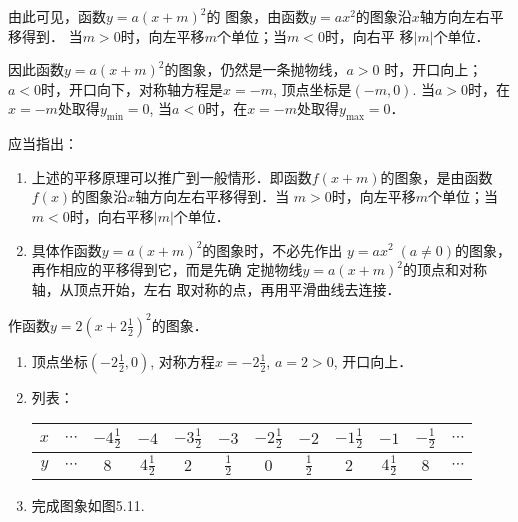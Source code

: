 由此可见，函数$y=a(x+m)^2$的
图象，由函数$y=ax^2$的图象沿$x$轴方向左右平移得到．
当$m>0$时，向左平移$m$个单位；当$m<0$时，向右平
移$|m|$个单位．

因此函数$y=a(x+m)^2$的图象，仍然是一条抛物线，$a>0$
时，开口向上；$a<0$时，开口向下，对称轴方程是$x=-m$,
顶点坐标是$(-m,0)$. 当$a>0$时，在$x=-m$处取得$y_{\min}=0$, 当$a<0$时，在$x=-m$处取得$y_{\max}=0$．

应当指出：
\begin{enumerate}
    \item 上述的平移原理可以推广到一般情形．即函数$f(x+m)$的图象，是由函数$f(x)$的图象沿$x$轴方向左右平移得到．当
    $m>0$时，向左平移$m$个单位；当$m<0$时，向右平移$|m|$个单位．
    \item 具体作函数$y=a(x+m)^2$的图象时，不必先作出
    $y=ax^2\; (a\ne 0)$的图象，再作相应的平移得到它，而是先确
    定抛物线$y=a(x+m)^2$的顶点和对称轴，从顶点开始，左右
    取对称的点，再用平滑曲线去连接．
\end{enumerate}

\begin{example}
    作函数$y=2\left(x+2\frac{1}{2}\right)^2$的图象．
\end{example}

\begin{solution}
\begin{enumerate}
    \item 顶点坐标$\left(-2\frac{1}{2},0\right)$, 对称方程$x=-2\frac{1}{2}$,
    $a=2>0$, 开口向上．
    \item 列表：
\begin{center}
\begin{tabular}{c|ccccccccccc}
\hline
$x$&$\cdots$& $-4\tfrac{1}{2}$ &  $-4$ &  $-3\tfrac{1}{2}$ &  $-3$ &  $-2\tfrac{1}{2}$ &  $-2$ &  $-1\tfrac{1}{2}$ &  $-1$ &  $-\tfrac{1}{2}$ &$\cdots$\\
\hline
$y$&$\cdots$ & $8$& $4\tfrac{1}{2}$ &  $2$ &  $\tfrac{1}{2}$ &  $0$ &  $\tfrac{1}{2}$ &  $2$ &  $4\tfrac{1}{2}$ &  $8$ &  $\cdots$ \\
\hline
\end{tabular}
\end{center}

\item 完成图象如图5.11.
\end{enumerate}      

\begin{figure}[htp]
    \centering
{}
    \caption{}
\end{figure}
\end{solution}


